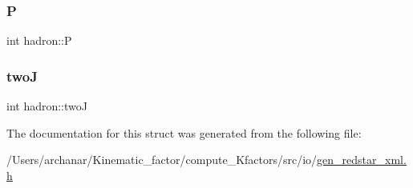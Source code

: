 \subsubsection{\texorpdfstring{P}{P}}
{\footnotesize\ttfamily int hadron\+::P}

\mbox{\label{structhadron_ae190a1452b80921c1fc32bbfb805ae9d}} 
\subsubsection{\texorpdfstring{twoJ}{twoJ}}
{\footnotesize\ttfamily int hadron\+::twoJ}



The documentation for this struct was generated from the following file\+:\begin{DoxyCompactItemize}
\item 
/\+Users/archanar/\+Kinematic\+\_\+factor/compute\+\_\+\+Kfactors/src/io/\mbox{\hyperlink{gen__redstar__xml_8h}{gen\+\_\+redstar\+\_\+xml.\+h}}\end{DoxyCompactItemize}
